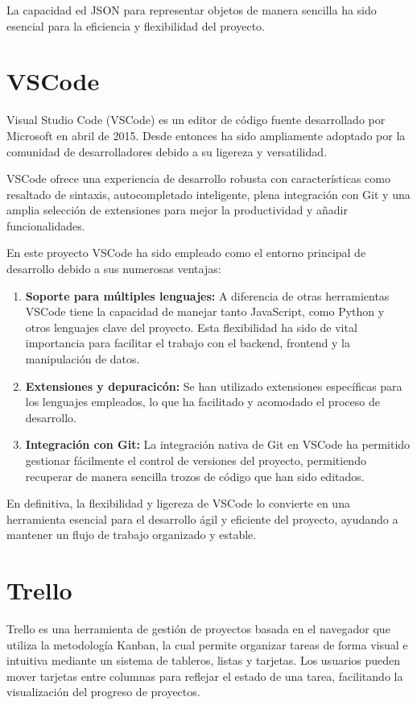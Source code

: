 \documentclass[a4paper, 12pt]{book}
\begin{document}
La capacidad ed JSON para representar objetos de manera sencilla ha sido esencial para la eficiencia y flexibilidad del proyecto.

\section{VSCode}
Visual Studio Code (VSCode) es un editor de código fuente desarrollado por Microsoft en abril de 2015. Desde entonces ha sido ampliamente adoptado por la comunidad de desarrolladores debido a su ligereza y versatilidad.

VSCode ofrece una experiencia de desarrollo robusta con características como resaltado de sintaxis, autocompletado inteligente, plena integración con Git y una amplia selección de extensiones para mejor la productividad y añadir funcionalidades.

En este proyecto VSCode ha sido empleado como el entorno principal de desarrollo debido a sus numerosas ventajas:

\begin{enumerate}
    \item \textbf{Soporte para múltiples lenguajes: } A diferencia de otras herramientas VSCode tiene la capacidad de manejar tanto JavaScript, como Python y otros lenguajes clave del proyecto. Esta flexibilidad ha sido de vital importancia para facilitar el trabajo con el backend, frontend y la manipulación de datos.
    \item \textbf{Extensiones y depuracicón: } Se han utilizado extensiones específicas para los lenguajes empleados, lo que ha facilitado y acomodado el proceso de desarrollo.
    \item \textbf{Integración con Git: } La integración nativa de Git en VSCode ha permitido gestionar fácilmente el control de versiones del proyecto, permitiendo recuperar de manera sencilla trozos de código que han sido editados.
\end{enumerate}

En definitiva, la flexibilidad y ligereza de VSCode lo convierte en una herramienta esencial para el desarrollo ágil y eficiente del proyecto, ayudando a mantener un flujo de trabajo organizado y estable.

\section{Trello}
Trello es una herramienta de gestión de proyectos basada en el navegador que utiliza la metodología Kanban, la cual permite organizar tareas de forma visual e intuitiva mediante un sistema de tableros, listas y tarjetas. Los usuarios pueden mover tarjetas entre columnas para reflejar el estado de una tarea, facilitando la visualización del progreso de proyectos.
\end{document}
